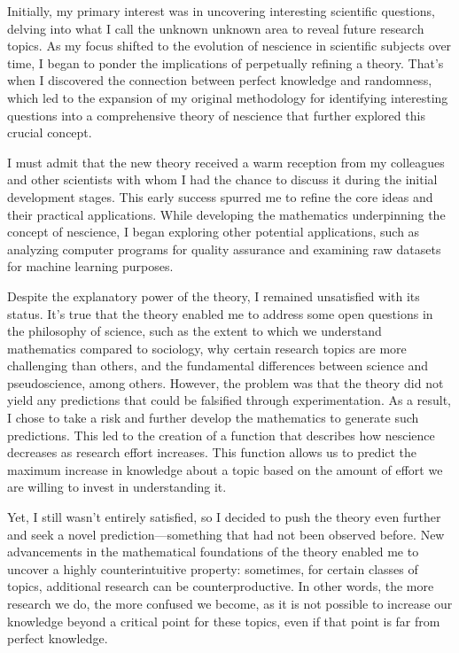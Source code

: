 Initially, my primary interest was in uncovering interesting scientific questions, delving into what I call the unknown unknown area to reveal future research topics. As my focus shifted to the evolution of nescience in scientific subjects over time, I began to ponder the implications of perpetually refining a theory. That's when I discovered the connection between perfect knowledge and randomness, which led to the expansion of my original methodology for identifying interesting questions into a comprehensive theory of nescience that further explored this crucial concept.

I must admit that the new theory received a warm reception from my colleagues and other scientists with whom I had the chance to discuss it during the initial development stages. This early success spurred me to refine the core ideas and their practical applications. While developing the mathematics underpinning the concept of nescience, I began exploring other potential applications, such as analyzing computer programs for quality assurance and examining raw datasets for machine learning purposes.

Despite the explanatory power of the theory, I remained unsatisfied with its status. It's true that the theory enabled me to address some open questions in the philosophy of science, such as the extent to which we understand mathematics compared to sociology, why certain research topics are more challenging than others, and the fundamental differences between science and pseudoscience, among others. However, the problem was that the theory did not yield any predictions that could be falsified through experimentation. As a result, I chose to take a risk and further develop the mathematics to generate such predictions. This led to the creation of a function that describes how nescience decreases as research effort increases. This function allows us to predict the maximum increase in knowledge about a topic based on the amount of effort we are willing to invest in understanding it.

Yet, I still wasn't entirely satisfied, so I decided to push the theory even further and seek a novel prediction—something that had not been observed before. New advancements in the mathematical foundations of the theory enabled me to uncover a highly counterintuitive property: sometimes, for certain classes of topics, additional research can be counterproductive. In other words, the more research we do, the more confused we become, as it is not possible to increase our knowledge beyond a critical point for these topics, even if that point is far from perfect knowledge.

